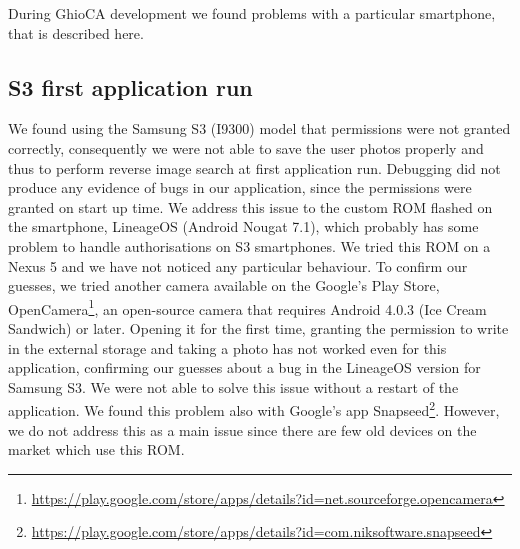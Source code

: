 During GhioCA development we found problems with a particular smartphone, that 
is described here.

\subsection{S3 first application run}

We found using the Samsung S3 (I9300) model that permissions were not granted 
correctly, consequently we were not able to save the user photos properly and 
thus to perform reverse image search at first application run. Debugging did not 
produce any evidence of bugs in our application, since the permissions were 
granted on start up time.
We address this issue to the custom ROM flashed on the smartphone, LineageOS 
(Android Nougat 7.1), which probably has some problem to handle authorisations 
on S3 smartphones. We tried this ROM on a Nexus 5 and we have not noticed any 
particular behaviour.
To confirm our guesses, we tried another camera available on the Google's Play 
Store, 
OpenCamera\footnote{\url{
https://play.google.com/store/apps/details?id=net.sourceforge.opencamera}}, an 
open-source camera that requires Android 4.0.3 (Ice Cream Sandwich) or later.
Opening it for the first time, granting the permission to write in the external 
storage and taking a photo has not worked even for this application, confirming 
our guesses about a bug in the LineageOS version for Samsung S3.
We were not able to solve this issue without a restart of the application. We 
found this problem also with Google's app 
Snapseed\footnote{\url{
https://play.google.com/store/apps/details?id=com.niksoftware.snapseed}}.
However, we do not address this as a main issue since there are few old devices 
on the market which use this ROM.

